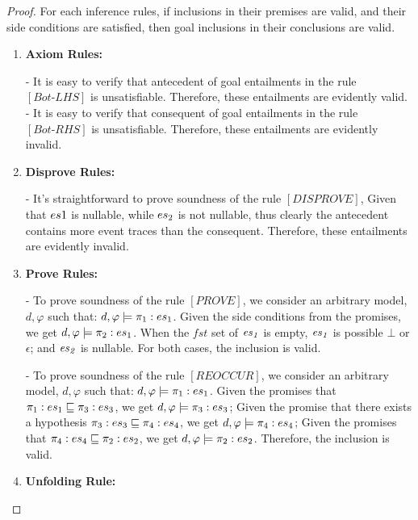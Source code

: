 \documentclass[acmsmall,10pt,review]{acmart}
\newcommand{\es}{\textcolor{black}{\ensuremath{{es}}}}
\newcommand{\code}[1]{{\tt{\ensuremath{\m{#1}}}}}
\newcommand{\codeme}[1]{{\tt{\ensuremath{#1}}}}
\newcommand{\CONTAIN}{\sqsubseteq}
\newcommand{\m}{\mathit}
\begin{document}
\begin{proof}
For each inference rules, if inclusions in their premises are valid, and their side conditions are satisfied, then goal inclusions in their conclusions are valid.

\begin{enumerate}
\item \textbf{Axiom Rules:} 

- It is easy to verify that antecedent of goal entailments in the rule \codeme{[Bot\text{-}LHS]} is unsatisfiable. Therefore, these entailments are evidently valid.\\
- It is easy to verify that consequent of goal entailments in the rule \codeme{[Bot\text{-}RHS]} is unsatisfiable. Therefore, these entailments are evidently invalid.\\


\item \textbf{Disprove Rules:} 

- It's straightforward to prove soundness of the rule \codeme{[DISPROVE]}, Given that \codeme{ \es1} is nullable, while \codeme{ \es_2} is not nullable, thus clearly the antecedent contains more event traces than the consequent.  Therefore, these entailments are evidently invalid.\\


\item \textbf{Prove Rules:} 

- To prove soundness of the rule \code{[PROVE]}, we consider an arbitrary model, \codeme{d,  \varphi} such that:  \codeme{d,  \varphi \models  {\pi_1 : \es_1}}. Given the side conditions from the promises, we get \codeme{d,  \varphi \models {\pi_2 : \es_1}}. When the \code{\m{fst}} set of \code{\es_1} is empty, \code{\es_1} is possible \code{\bot} or \code{\epsilon}; and \code{\es_2} is nullable. For both cases, the inclusion is valid. 

- To prove soundness of the rule \codeme{[REOCCUR]}, we consider an arbitrary model, \codeme{d,  \varphi} such that:  \codeme{d,  \varphi \models  {\pi_1 : \es_1}}. Given the promises that  \codeme{\pi_1 : \es_1 \CONTAIN \pi_3 : \es_3}, we get \codeme{d,  \varphi \models {\pi_3 : \es_3}}; Given the promise that there exists a hypothesis \codeme{\pi_3 : \es_3 \CONTAIN  \pi_4 : \es_4}, we get \codeme{d,  \varphi \models {\pi_4 : \es_4}}; Given the promises that  \codeme{\pi_4 : \es_4 \CONTAIN \pi_2 : \es_2}, we get \codeme{d,  \varphi \models {\pi_2 : \es_2}}. Therefore,  the inclusion is valid. 
\\


\item \textbf{Unfolding Rule:} 




\end{enumerate}
\end{proof}
\end{document}
